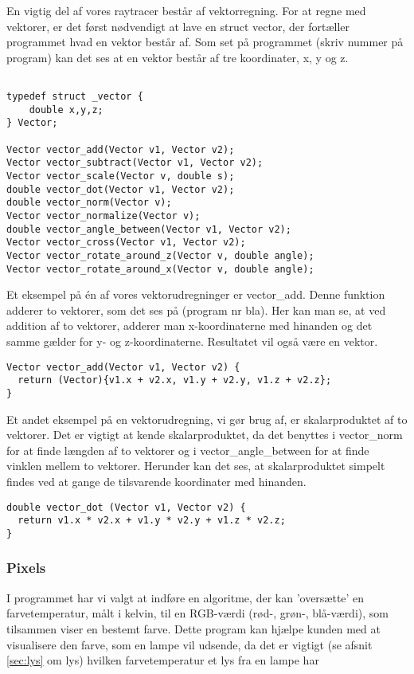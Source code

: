En vigtig del af vores raytracer består af vektorregning. For at regne med vektorer, er det først nødvendigt at lave en struct vector, der fortæller programmet hvad en vektor består af. Som set på programmet (skriv nummer på program) kan det ses at en vektor består af tre koordinater, x, y og z. 

\begin{lstlisting}[style=Cstyle, caption=Vektorprototyper og struct]

typedef struct _vector {
    double x,y,z;
} Vector;

Vector vector_add(Vector v1, Vector v2);
Vector vector_subtract(Vector v1, Vector v2);
Vector vector_scale(Vector v, double s);
double vector_dot(Vector v1, Vector v2);
double vector_norm(Vector v);
Vector vector_normalize(Vector v);
double vector_angle_between(Vector v1, Vector v2);
Vector vector_cross(Vector v1, Vector v2);
Vector vector_rotate_around_z(Vector v, double angle);
Vector vector_rotate_around_x(Vector v, double angle);

\end{lstlisting}

Et eksempel på én af vores vektorudregninger er vector\_add. Denne funktion adderer to vektorer, som det ses på (program nr bla). Her kan man se, at ved addition af to vektorer, adderer man x-koordinaterne med hinanden og det samme gælder for y- og z-koordinaterne. Resultatet vil også være en vektor.

\begin{lstlisting}[style=Cstyle, caption=vector add]
Vector vector_add(Vector v1, Vector v2) {
  return (Vector){v1.x + v2.x, v1.y + v2.y, v1.z + v2.z};
}

\end{lstlisting}

Et andet eksempel på en vektorudregning, vi gør brug af, er skalarproduktet af to vektorer. Det er vigtigt at kende skalarproduktet, da det benyttes i vector\_norm for at finde længden af to vektorer og i vector\_angle\_between for at finde vinklen mellem to vektorer. Herunder kan det ses, at skalarproduktet simpelt findes ved at gange de tilsvarende koordinater med hinanden.

\begin{lstlisting}[style=Cstyle, caption=vector dot]
double vector_dot (Vector v1, Vector v2) {
  return v1.x * v2.x + v1.y * v2.y + v1.z * v2.z;
}
\end{lstlisting}

\subsubsection{Pixels}
I programmet har vi valgt at indføre en algoritme, der kan ’oversætte’ en farvetemperatur, målt i kelvin, til en RGB-værdi (rød-, grøn-, blå-værdi), som tilsammen viser en bestemt farve. Dette program kan hjælpe kunden med at visualisere den farve, som en lampe vil udsende, da det er vigtigt (se afsnit \ref{sec:lys} om lys) hvilken farvetemperatur et lys fra en lampe har




